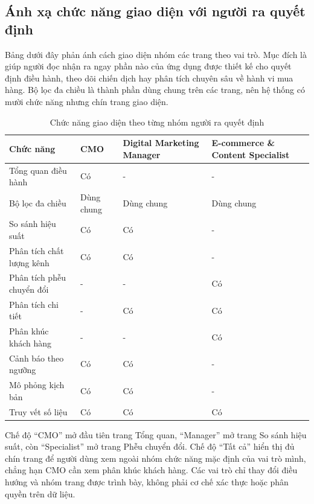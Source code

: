 \subsection{Ánh xạ chức năng giao diện với người ra quyết định}

Bảng dưới đây phản ánh cách giao diện nhóm các trang theo vai trò. Mục đích là giúp người đọc nhận ra ngay phần nào của ứng dụng được thiết kế cho quyết định điều hành, theo dõi chiến dịch hay phân tích chuyên sâu về hành vi mua hàng. Bộ lọc đa chiều là thành phần dùng chung trên các trang, nên hệ thống có mười chức năng nhưng chín trang giao diện. \medskip

\begin{table}[H]
    \centering
    \renewcommand{\arraystretch}{1.25}
    \caption{Chức năng giao diện theo từng nhóm người ra quyết định}
    \label{tab:dashboard-role-mapping}
    \begin{tabularx}{\textwidth}{
        >{\raggedright\arraybackslash}p{3.8cm}
        >{\raggedright\arraybackslash}p{2.0cm}
        >{\raggedright\arraybackslash}p{3.7cm}
        X
    }
        \hline
        \textbf{Chức năng} &
        \textbf{CMO} &
        \textbf{Digital Marketing Manager} &
        \textbf{E-commerce \& Content Specialist} \\
        \hline
        Tổng quan điều hành & Có & - & - \\
        Bộ lọc đa chiều & Dùng chung & Dùng chung & Dùng chung \\
        So sánh hiệu suất & Có & Có & - \\
        Phân tích chất lượng kênh & Có & Có & - \\
        Phân tích phễu chuyển đổi & - & - & Có \\
        Phân tích chi tiết & - & Có & Có \\
        Phân khúc khách hàng & - & - & Có \\
        Cảnh báo theo ngưỡng & Có & Có & - \\
        Mô phỏng kịch bản & Có & Có & - \\
        Truy vết số liệu & Có & Có & Có \\
        \hline
    \end{tabularx}
\end{table}

Chế độ ``CMO'' mở đầu tiên trang Tổng quan, ``Manager'' mở trang So sánh hiệu suất, còn ``Specialist'' mở trang Phễu chuyển đổi. Chế độ ``Tất cả'' hiển thị đủ chín trang để người dùng xem ngoài nhóm chức năng mặc định của vai trò mình, chẳng hạn CMO cần xem phân khúc khách hàng. Các vai trò chỉ thay đổi điều hướng và nhóm trang được trình bày, không phải cơ chế xác thực hoặc phân quyền trên dữ liệu. \medskip


